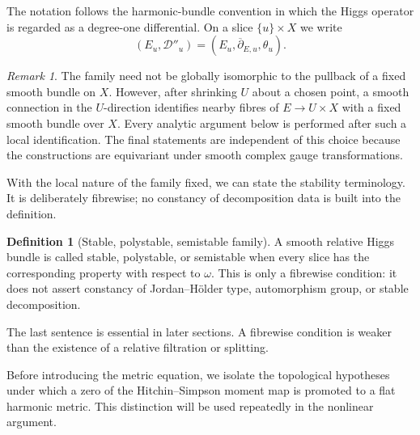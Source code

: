 \documentclass[11pt,reqno]{amsart}
\theoremstyle{definition}
\newtheorem{definition}[theorem]{Definition}
\theoremstyle{remark}
\newtheorem{remark}[theorem]{Remark}
\newcommand{\cD}{\mathcal D}
\newcommand{\ddbar}{\overline\partial}
\begin{document}
The notation follows the harmonic-bundle convention in which the Higgs operator is regarded as a degree-one differential.  On a slice $\{u\}\times X$ we write
\[
  (E_u,\cD''_u)=(E_u,\ddbar_{E,u},\theta_u).
\]

\begin{remark}
The family need not be globally isomorphic to the pullback of a fixed smooth bundle on $X$.  However, after shrinking $U$ about a chosen point, a smooth connection in the $U$-direction identifies nearby fibres of $E\to U\times X$ with a fixed smooth bundle over $X$.  Every analytic argument below is performed after such a local identification.  The final statements are independent of this choice because the constructions are equivariant under smooth complex gauge transformations.
\end{remark}

With the local nature of the family fixed, we can state the stability terminology.  It is deliberately fibrewise; no constancy of decomposition data is built into the definition.

\begin{definition}[Stable, polystable, semistable family]
A smooth relative Higgs bundle is called stable, polystable, or semistable when every slice has the corresponding property with respect to $\omega$.  This is only a fibrewise condition: it does not assert constancy of Jordan--H\"older type, automorphism group, or stable decomposition.
\end{definition}

The last sentence is essential in later sections.  A fibrewise condition is weaker than the existence of a relative filtration or splitting.


Before introducing the metric equation, we isolate the topological hypotheses under which a zero of the Hitchin--Simpson moment map is promoted to a flat harmonic metric.  This distinction will be used repeatedly in the nonlinear argument.

\label{sec:numerical-conditions}
\end{document}
